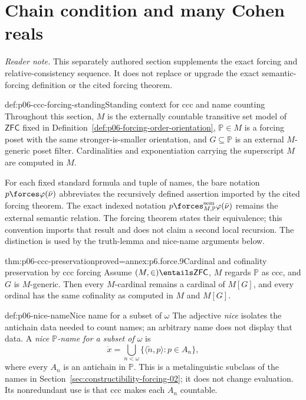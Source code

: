 
\section{Chain condition and many Cohen reals}
\label{sec:p06-ccc-cohen}

\noindent\textit{Reader note.}  This separately authored section supplements
the exact forcing and relative-consistency sequence.  It does not replace or
upgrade the exact semantic-forcing definition or the cited forcing theorem.

\begin{hbconvention}{def:p06-ccc-forcing-standing}{Standing context for ccc and name counting}
Throughout this section, \(M\) is the externally countable transitive set
model of \(\mathsf{ZFC}\) fixed in
Definition~\ref{def:p06-forcing-order-orientation},
\(\mathbb P\in M\) is a forcing poset with the same stronger-is-smaller
orientation, and \(G\subseteq\mathbb P\) is an external
\(M\)-generic poset filter.  Cardinalities and exponentiation carrying the
superscript \(M\) are computed in \(M\).

For each fixed standard formula and tuple of names, the bare notation
\(p\forces\varphi(\bar\nu)\) abbreviates the recursively defined assertion
imported by the cited forcing theorem.  The exact indexed notation
\(p\forces^{\mathrm{sem}}_{M,\mathbb P}\varphi(\bar\nu)\) remains the external
semantic relation.  The forcing theorem states their equivalence; this
convention imports that result and does not claim a second local recursion.
The distinction is used by the truth-lemma and nice-name arguments below.
\end{hbconvention}

\begin{hbtheorem}{thm:p06-ccc-preservation}{proved=annex:p6.force.9}{Cardinal and cofinality preservation by ccc forcing}
Assume \((M,\in)\entails\mathsf{ZFC}\), \(M\) regards \(\mathbb P\) as ccc,
and \(G\) is \(M\)-generic.  Then every \(M\)-cardinal remains a cardinal of
\(M[G]\), and every ordinal has the same cofinality as computed in \(M\) and
\(M[G]\).
\end{hbtheorem}

\begin{hbdefinition}{def:p06-nice-name}{Nice name for a subset of \(\omega\)}
The adjective \emph{nice} isolates the antichain data needed to count names;
an arbitrary name does not display that data.  A \emph{nice
\(\mathbb P\)-name for a subset of \(\omega\)} is
\[
  \dot x=\bigcup_{n<\omega}
  \{\langle\check n,p\rangle:p\in A_n\},
\]
where every \(A_n\) is an antichain in \(\mathbb P\).  This is a
metalinguistic subclass of the names in
Section~\ref{sec:constructibility-forcing-02}; it does not change evaluation.  Its
nonredundant use is that ccc makes each \(A_n\) countable.
\end{hbdefinition}

